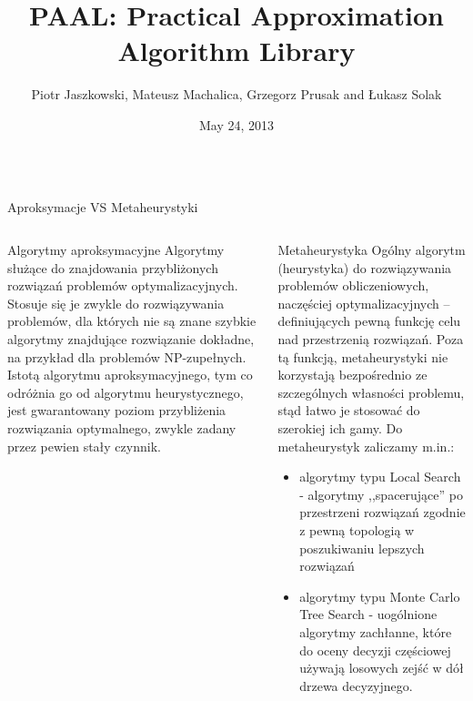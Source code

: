 \documentclass[final,hyperref={pdfpagelabels=false}]{beamer}
\title{\huge PAAL: Practical Approximation Algorithm Library}
\author{Piotr Jaszkowski, Mateusz Machalica, Grzegorz Prusak and Łukasz Solak}
\institute[University of Warsaw]{The Faculty of Mathematics, Informatics and Mechanics, University of Warsaw, Warsaw, Poland}
\date[May 24, 2013]{May 24, 2013}
\begin{document}
\begin{frame}

	\begin{columns}		
		\begin{column}{.96\textwidth}
			\vspace{1cm}
			\begin{center}
			\veryHuge Aproksymacje VS Metaheurystyki
			\end{center}
			\vspace{1cm}
		\end{column}
	\end{columns}

	\begin{columns}
		\begin{column}{.46\textwidth}
			\begin{block}{Algorytmy aproksymacyjne}
				Algorytmy służące do znajdowania przybliżonych rozwiązań
				problemów optymalizacyjnych. Stosuje się je zwykle do rozwiązywania
				problemów, dla których nie są znane szybkie algorytmy znajdujące
				rozwiązanie dokładne, na przykład dla problemów NP-zupełnych.
				Istotą algorytmu aproksymacyjnego, tym co odróżnia go od
				algorytmu heurystycznego, jest gwarantowany poziom przybliżenia
				rozwiązania optymalnego, zwykle zadany przez pewien stały czynnik.
				\vspace{5cm}
			\end{block}
		\end{column}
		\begin{column}{.46\textwidth}
			\begin{block}{Metaheurystyka}
				Ogólny algorytm (heurystyka) do rozwiązywania problemów obliczeniowych,
				naczęściej optymalizacyjnych -- definiujących pewną funkcję celu nad
				przestrzenią rozwiązań. Poza tą funkcją, metaheurystyki nie korzystają
				bezpośrednio ze szczególnych własności problemu, stąd łatwo je stosować
				do szerokiej ich gamy. Do metaheurystyk zaliczamy m.in.:
				\begin{itemize}
				\item algorytmy typu Local Search - algorytmy ,,spacerujące'' po przestrzeni
					rozwiązań zgodnie z pewną topologią w poszukiwaniu lepszych rozwiązań
				\item algorytmy typu Monte Carlo Tree Search - uogólnione algorytmy zachłanne,
					które do oceny decyzji częściowej używają losowych zejść w dół
					drzewa decyzyjnego.
				\end{itemize}
			
			\end{block}
		\end{column}
	\end{columns}
	

\end{frame}
\end{document}
